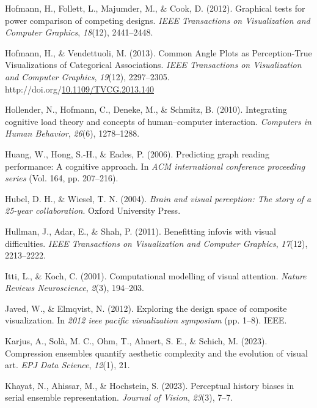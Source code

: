 \documentclass[print]{nuthesis}
\newlength{\cslhangindent}
\newenvironment{CSLReferences}[2]%
{\setlength{\parindent}{0pt}%
\everypar{\setlength{\hangindent}{\cslhangindent}}\ignorespaces}%
{\par}
\begin{document}
\begin{CSLReferences}{1}{0}
\leavevmode{}%
Hofmann, H., Follett, L., Majumder, M., \& Cook, D. (2012). Graphical tests for power comparison of competing designs. \emph{IEEE Transactions on Visualization and Computer Graphics}, \emph{18}(12), 2441--2448.

\leavevmode{}%
Hofmann, H., \& Vendettuoli, M. (2013). {Common Angle Plots as Perception-True Visualizations of Categorical Associations}. \emph{IEEE Transactions on Visualization and Computer Graphics}, \emph{19}(12), 2297--2305. http://doi.org/\href{https://doi.org/10.1109/TVCG.2013.140}{10.1109/TVCG.2013.140}

\leavevmode{}%
Hollender, N., Hofmann, C., Deneke, M., \& Schmitz, B. (2010). Integrating cognitive load theory and concepts of human--computer interaction. \emph{Computers in Human Behavior}, \emph{26}(6), 1278--1288.

\leavevmode{}%
Huang, W., Hong, S.-H., \& Eades, P. (2006). Predicting graph reading performance: A cognitive approach. In \emph{ACM international conference proceeding series} (Vol. 164, pp. 207--216).

\leavevmode{}%
Hubel, D. H., \& Wiesel, T. N. (2004). \emph{Brain and visual perception: The story of a 25-year collaboration}. Oxford University Press.

\leavevmode{}%
Hullman, J., Adar, E., \& Shah, P. (2011). Benefitting infovis with visual difficulties. \emph{IEEE Transactions on Visualization and Computer Graphics}, \emph{17}(12), 2213--2222.

\leavevmode{}%
Itti, L., \& Koch, C. (2001). Computational modelling of visual attention. \emph{Nature Reviews Neuroscience}, \emph{2}(3), 194--203.

\leavevmode{}%
Javed, W., \& Elmqvist, N. (2012). Exploring the design space of composite visualization. In \emph{2012 ieee pacific visualization symposium} (pp. 1--8). IEEE.

\leavevmode{}%
Karjus, A., Solà, M. C., Ohm, T., Ahnert, S. E., \& Schich, M. (2023). Compression ensembles quantify aesthetic complexity and the evolution of visual art. \emph{EPJ Data Science}, \emph{12}(1), 21.

\leavevmode{}%
Khayat, N., Ahissar, M., \& Hochstein, S. (2023). Perceptual history biases in serial ensemble representation. \emph{Journal of Vision}, \emph{23}(3), 7--7.


\end{CSLReferences}
\end{document}
